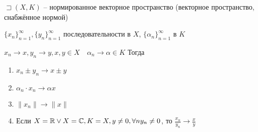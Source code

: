     \begin{theorem}
        $\sqsupset (X,K)$ -- нормированное векторное пространство (векторное пространство, снабжённое нормой)

        $\{x_n\}_{n=1}^{\infty }, \{y_n\}_{n=1}^{\infty }$ последовательности в $X$, $\{\alpha_n\}_{n=1}^{\infty }$ в $K$

        $x_{n} \to x, y_{n} \to y, x, y\in X\quad \alpha_n\to \alpha\in K$
        Тогда 
        \begin{enumerate}
            \item $x_{n} \pm y_{n} \to  x\pm y$
            \item $\alpha_n\cdot x_n \to \alpha x$
            \item $\|x_n\| \to  \|x\|$
            \item Если $X = \mathbb{R} \lor X = \mathbb{C}, K=X, y\neq 0, \forall n y_{n} \neq 0$, то $\frac{x_{n} }{y_{n} } \to \frac{x}{y}$
        \end{enumerate}
    \end{theorem}
